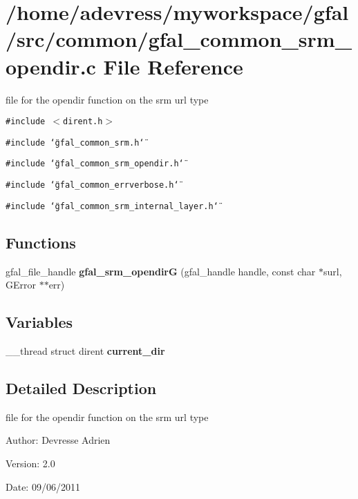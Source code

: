 \section{/home/adevress/myworkspace/gfal/src/common/gfal\_\-common\_\-srm\_\-opendir.c File Reference}
\label{gfal__common__srm__opendir_8c}
file for the opendir function on the srm url type 

{\tt \#include $<$dirent.h$>$}\par
{\tt \#include \char`\"{}gfal\_\-common\_\-srm.h\char`\"{}}\par
{\tt \#include \char`\"{}gfal\_\-common\_\-srm\_\-opendir.h\char`\"{}}\par
{\tt \#include \char`\"{}gfal\_\-common\_\-errverbose.h\char`\"{}}\par
{\tt \#include \char`\"{}gfal\_\-common\_\-srm\_\-internal\_\-layer.h\char`\"{}}\par
\subsection*{Functions}
\begin{CompactItemize}
\item 
gfal\_\-file\_\-handle \textbf{gfal\_\-srm\_\-opendir\-G} (gfal\_\-handle handle, const char $\ast$surl, GError $\ast$$\ast$err)\label{gfal__common__srm__opendir_8c_7084d6727c84907e67b1190ce7b15f94}

\end{CompactItemize}
\subsection*{Variables}
\begin{CompactItemize}
\item 
\_\-\_\-thread struct dirent \textbf{current\_\-dir}\label{gfal__common__srm__opendir_8c_a43885a4123b3722a5f6b6cb73663047}

\end{CompactItemize}


\subsection{Detailed Description}
file for the opendir function on the srm url type 

\begin{Desc}
\item[Author:]Devresse Adrien \end{Desc}
\begin{Desc}
\item[Version:]2.0 \end{Desc}
\begin{Desc}
\item[Date:]09/06/2011 \end{Desc}
